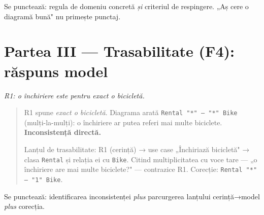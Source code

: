 \documentclass[12pt,a4paper]{article}
\begin{document}
Se punctează: regula de domeniu concretă \emph{și} criteriul de
respingere. „Aș cere o diagramă bună" nu primește punctaj.

\section*{Partea III — Trasabilitate (F4): răspuns model}

\textit{R1: o închiriere este pentru exact o bicicletă.}

\begin{quote}
R1 spune \emph{exact o bicicletă}. Diagrama arată
\texttt{Rental "*" -- "*" Bike} (mulți-la-mulți): o închiriere ar putea
referi mai multe biciclete. \textbf{Inconsistență directă.}

Lanțul de trasabilitate: R1 (cerință) → use case „Închiriază
bicicletă" → clasa \texttt{Rental} și relația ei cu \texttt{Bike}.
Citind multiplicitatea cu voce tare — „o închiriere are mai multe
biciclete?" — contrazice R1. Corecție: \texttt{Rental "*" -- "1" Bike}.
\end{quote}

Se punctează: identificarea inconsistenței \emph{plus} parcurgerea
lanțului cerință→model \emph{plus} corecția.
\end{document}
